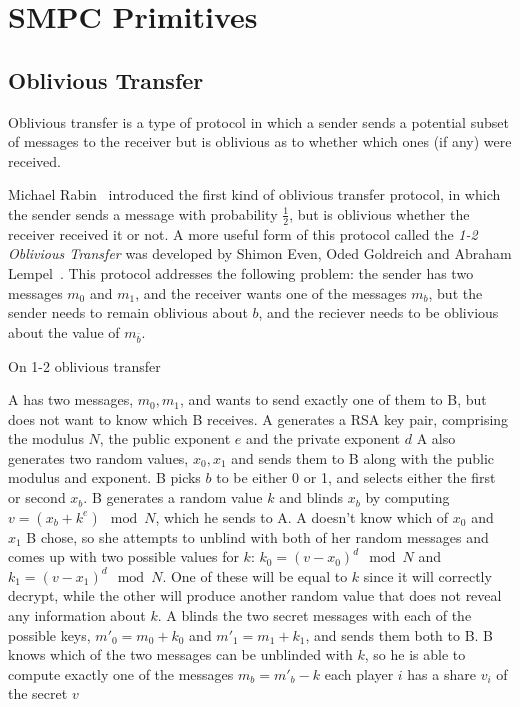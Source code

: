 

\section{SMPC Primitives}
\label{sec:smpc-prim}

\subsection{Oblivious Transfer}
\label{sec:ot-prim}

Oblivious transfer is a type of protocol in which a sender sends a potential subset of messages to the 
receiver but is oblivious as to whether which ones (if any) were received.

Michael Rabin~\cite{Rabin81:HtESwOT} introduced the first kind of oblivious 
transfer protocol, in which the sender sends a message with probability 
$\frac{1}{2}$, but is oblivious whether the receiver received it or not. A more
useful form of this protocol called the \emph{1-2 Oblivious Transfer} was
developed by Shimon Even, Oded Goldreich and Abraham Lempel~\cite{Even:1985:RPS:3812.3818}.
This protocol addresses the following problem: the sender has two messages 
$m_0$ and $m_1$, and the receiver wants one of the messages $m_b$, but the 
sender needs to remain oblivious about $b$, and the reciever needs to be 
oblivious about the value of $m_{\bar{b}}$.

\begin{algorithm}
\caption{On 1-2 oblivious transfer}
\label{alg12ot}
\begin{algorithmic}
\REQUIRE A has two messages, $m_0, m_1$, and wants to send exactly one of them to B, but does not want to know which B receives.
\STATE A generates a RSA key pair, comprising the modulus $N$, the public exponent $e$ and the private exponent $d$
\STATE A also generates two random values, $x_0, x_1$ and sends them to B 
along with the public modulus and exponent.
\STATE B picks $b$ to be either 0 or 1, and selects either the first or second $x_b$.
\STATE B generates a random value $k$ and blinds $x_b$ by computing $v = (x_b + k^e)\mod N$, which he sends to A.
\STATE A doesn't know which of $x_0$ and $x_1$ B chose, so she attempts to unblind with both of her random messages and comes up with two possible values for $k$: $k_0 = (v - x_0)^d\mod N$ and $k_1 = (v - x_1)^d\mod N$.  One of these will be equal to $k$ since it will correctly decrypt, while the other will produce another random value that does not reveal any information about $k$.
\STATE A blinds the two secret messages with each of the possible keys, $m'_0 = m_0 + k_0$ and $m'_1 = m_1 + k_1$, and sends them both to B.
\STATE B knows which of the two messages can be unblinded with $k$, so he is able to compute exactly one of the messages $m_b = m'_b - k$
\ENSURE each player $i$ has a share $v_{i}$ of the secret $v$
\end{algorithmic}
\end{algorithm}

